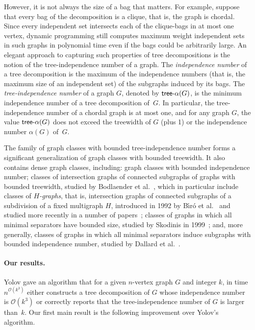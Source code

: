 \documentclass[11pt]{article}
\theoremstyle{definition}
\newcommand{\tin}{\mathsf{tree} \textnormal{-} \alpha}
\newcommand{\OO}{\mathcal{O}}
\begin{document}
However, it is not always the size of a bag that matters. For example, suppose that every bag of the decomposition is a clique, that is, the graph is chordal. Since every independent set intersects each of the clique-bags in at most one vertex, dynamic programming still computes maximum weight independent sets in such graphs in polynomial time even if the bags could be arbitrarily large.
An elegant approach to capturing such properties of tree decompositions 
is the notion of the tree-independence number of a graph.
The \emph{independence number} of a tree decomposition is the maximum of the independence numbers (that is, the maximum size of an independent set) of the subgraphs induced by its bags.
The \emph{tree-independence number} of a graph $G$, denoted by  $\tin(G)$,  is the minimum independence number of a tree decomposition of~$G$. In particular, the tree-independence number of a chordal graph is at most one, and for any graph $G$, the value $\tin(G)$ does not exceed the treewidth of $G$ (plus 1) or the independence number $\alpha(G)$ of~$G$.

The family of graph classes with bounded tree-independence number forms a significant generalization of graph classes with bounded treewidth.
It also contains dense graph classes, including: graph classes with bounded independence number;
classes of intersection graphs of connected subgraphs of graphs with bounded treewidth, studied by Bodlaender et al.~\cite{bodlaender1998}, which in particular include classes of \emph{{$H$}-graphs}, that is, intersection graphs of connected subgraphs of a subdivision of a fixed multigraph $H$, introduced in 1992 by B\'{\i}r\'{o} et al.~\cite{MR1172354} and studied more recently in a number of papers~\cite{MR4249058,MR4141534,MR4332111}; classes of graphs in which all minimal separators have bounded size, studied by Skodinis in 1999~\cite{Skodinis99}; and, more generally, classes of graphs in which all minimal separators induce subgraphs with bounded independence number, studied  by Dallard et al.~\cite{DallardMS24}.

\paragraph{Our results.}
Yolov \cite{Yolov18} gave an algorithm that for a given $n$-vertex graph $G$ and integer $k$, in time
$n^{\OO(k^3)}$ either constructs a tree decomposition of $G$ whose independence number is $\OO(k^3)$ or correctly reports that the tree-independence number of $G$ is larger than~$k$.
Our first main result is the following improvement over Yolov's algorithm.
\end{document}
